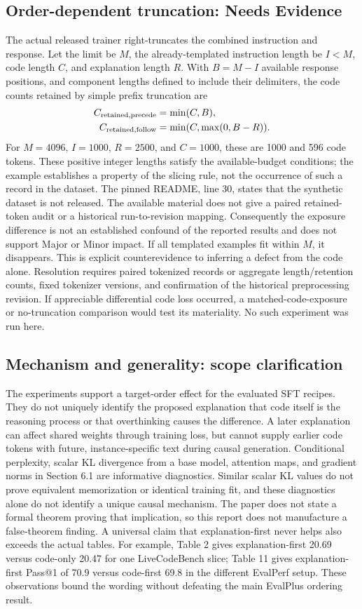 \documentclass[10pt]{article}
\begin{document}
\subsection*{Order-dependent truncation: Needs Evidence}
The actual released trainer right-truncates the combined instruction and response. Let the limit be \(M\), the already-templated instruction length be \(I<M\), code length \(C\), and explanation length \(R\). With \(B=M-I\) available response positions, and component lengths defined to include their delimiters, the code counts retained by simple prefix truncation are \[\begin{aligned}
 C_{\rm retained,precede}&=\min(C,B),\\
 C_{\rm retained,follow}&=\min(C,\max(0,B-R)).\end{aligned}\] For \(M=4096\), \(I=1000\), \(R=2500\), and \(C=1000\), these are 1000 and 596 code tokens. These positive integer lengths satisfy the available-budget conditions; the example establishes a property of the slicing rule, not the occurrence of such a record in the dataset. The pinned README, line 30, states that the synthetic dataset is not released. The available material does not give a paired retained-token audit or a historical run-to-revision mapping. Consequently the exposure difference is not an established confound of the reported results and does not support Major or Minor impact. If all templated examples fit within \(M\), it disappears. This is explicit counterevidence to inferring a defect from the code alone. Resolution requires paired tokenized records or aggregate length/retention counts, fixed tokenizer versions, and confirmation of the historical preprocessing revision. If appreciable differential code loss occurred, a matched-code-exposure or no-truncation comparison would test its materiality. No such experiment was run here.\par
\subsection*{Mechanism and generality: scope clarification}
The experiments support a target-order effect for the evaluated SFT recipes. They do not uniquely identify the proposed explanation that code itself is the reasoning process or that overthinking causes the difference. A later explanation can affect shared weights through training loss, but cannot supply earlier code tokens with future, instance-specific text during causal generation. Conditional perplexity, scalar KL divergence from a base model, attention maps, and gradient norms in Section 6.1 are informative diagnostics. Similar scalar KL values do not prove equivalent memorization or identical training fit, and these diagnostics alone do not identify a unique causal mechanism. The paper does not state a formal theorem proving that implication, so this report does not manufacture a false-theorem finding. A universal claim that explanation-first never helps also exceeds the actual tables. For example, Table 2 gives explanation-first 20.69 versus code-only 20.47 for one LiveCodeBench slice; Table 11 gives explanation-first Pass@1 of 70.9 versus code-first 69.8 in the different EvalPerf setup. These observations bound the wording without defeating the main EvalPlus ordering result.\par
\end{document}
